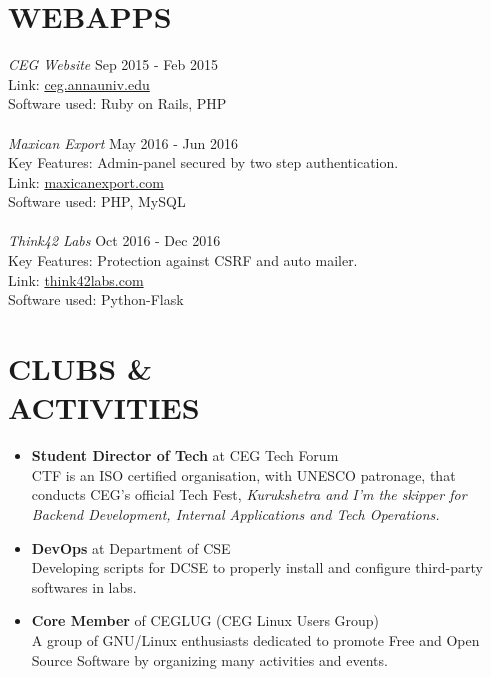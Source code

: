 \documentclass[margin, 10pt]{res} %
\begin{document}
\begin{resume}
\section{WEBAPPS}
{\sl CEG Website} \hfill Sep 2015 - Feb 2015 \\
Link: \href{http://ceg.annauniv.edu}{ceg.annauniv.edu} \\
Software used: Ruby on Rails, PHP \\
\\
{\sl Maxican Export} \hfill May 2016 - Jun 2016 \\
Key Features: Admin-panel secured by two step authentication. \\
Link: \href{http://maxicanexport.com}{maxicanexport.com} \\
Software used: PHP, MySQL \\
\\
{\sl Think42 Labs} \hfill Oct 2016 - Dec 2016 \\
Key Features: Protection against CSRF and auto mailer.\\
Link: \href{http://think42labs.com}{think42labs.com} \\
Software used: Python-Flask
\section{CLUBS \& \\ ACTIVITIES}
\begin{itemize}
\item \textbf{Student Director of Tech} at CEG Tech Forum \\
CTF is an ISO certified organisation, with UNESCO patronage, that conducts CEG's official Tech Fest, \sl{Kurukshetra} and I'm the skipper for Backend Development, Internal Applications and Tech Operations.
\item \textbf{DevOps} at Department of CSE \\
Developing scripts for DCSE to properly install and configure third-party softwares in labs.
\item \textbf{Core Member} of CEGLUG (CEG Linux Users Group) \\
A group of GNU/Linux enthusiasts dedicated to promote Free and Open Source Software by organizing many activities and events.
\end{itemize}

\end{resume}
\end{document}
